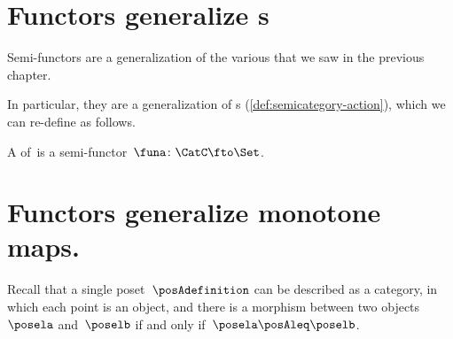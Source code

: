
\section[\dots as \SY{semicategory action}s]{Functors generalize s}


Semi-functors are a generalization of the various  that we saw in the previous chapter.


In particular, they are a generalization of s (\cref{def:semicategory-action}), which we can re-define as follows.

\begin{ctdefinition}\label{def:semicat-action-redefined}
    A  of~\CatC is a semi-functor~$\funa\colon \CatC \fto \Set$.
\end{ctdefinition}

\section[\dots as  monotone maps]{Functors generalize monotone maps.}
\label{sec:posetsarecats}


Recall that a single poset~$\posAdefinition$ can be described as a category, in which each point is an object, and there is a morphism between two objects~$\posela$ and~$\poselb$ if and only if~$\posela \posAleq \poselb$.

